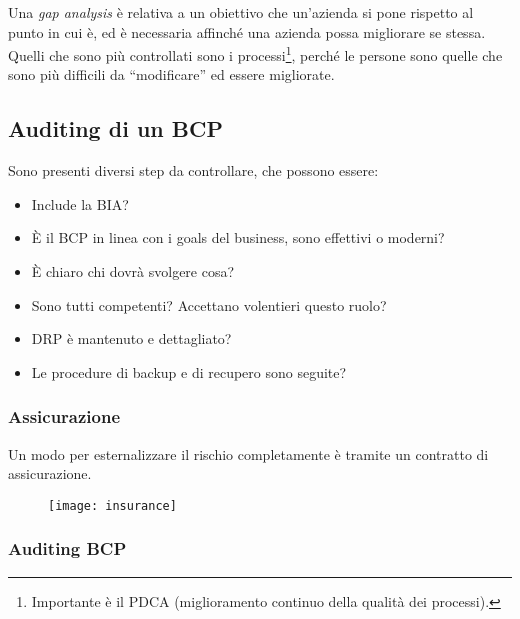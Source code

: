 Una \textit{gap analysis} è relativa a un obiettivo che un'azienda si pone
rispetto al punto in cui è, ed è necessaria affinché una azienda possa
migliorare se stessa. Quelli che sono più controllati sono i
processi\footnote{Importante è il PDCA (miglioramento continuo della qualità
dei processi).}, perché le persone sono quelle che sono più difficili da
``modificare'' ed essere migliorate.

\subsection{Auditing di un BCP}

Sono presenti diversi step da controllare, che possono essere:
\begin{itemize}
  \item Include la BIA?
  \item È il BCP in linea con i goals del business, sono effettivi o moderni?
  \item È chiaro chi dovrà svolgere cosa?
  \item Sono tutti competenti? Accettano volentieri questo ruolo?
  \item DRP è mantenuto e dettagliato?
  \item Le procedure di backup e di recupero sono seguite?
\end{itemize}

\subsubsection{Assicurazione}

Un modo per esternalizzare il rischio completamente è tramite un contratto di
assicurazione.

\begin{figure}[H]
\centering
\texttt{[image: insurance]}
\end{figure}

\subsubsection{Auditing BCP}

